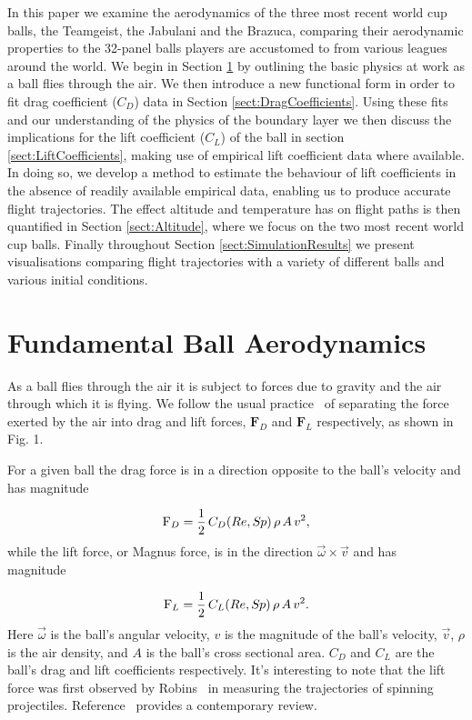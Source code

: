\documentclass[a4paper]{article}
\begin{document}
In this paper we examine the aerodynamics of the three most recent world cup balls, the Teamgeist, the Jabulani and the Brazuca, comparing their aerodynamic properties to the 32-panel balls players are accustomed to from various leagues around the world.  We begin in Section \ref{sect:FundamentalBallAerodynamics} by outlining the basic physics at work as a ball flies through the air.  We then introduce a new functional form in order to fit drag coefficient ($C_{D}$) data in Section \ref{sect:DragCoefficients}.  Using these fits and our understanding of the physics of the boundary layer we then discuss the implications for the lift coefficient ($C_{L}$) of the ball in section \ref{sect:LiftCoefficients}, making use of empirical lift coefficient data where available.  In doing so, we develop a method to estimate the behaviour of lift coefficients in the absence of readily available empirical data, enabling us to produce accurate flight trajectories.  The effect altitude and temperature has on flight paths is then quantified in Section \ref{sect:Altitude}, where we focus on the two most recent world cup balls.  Finally throughout Section \ref{sect:SimulationResults} we present visualisations comparing flight trajectories with a variety of different balls and various initial conditions.

\section{Fundamental Ball Aerodynamics}
\label{sect:FundamentalBallAerodynamics}
As a ball flies through the air it is subject to forces due to gravity and the air through which it is flying.  We follow the usual practice~\cite{CarreMJAsaiTAkatsukaTandHaakeSJ, JEGoff, Goffetal2017} of separating the force exerted by the air into drag and lift forces, $\textbf{F}_D$ and $\textbf{F}_L$ respectively, as shown in Fig. 1.

For a given ball the drag force is in a direction opposite to the ball's velocity and has magnitude~\cite{DeMestreN}

\begin{equation} \label{eq:Fd}
\textrm{F}_D = \frac{1}{2}\,C_D(Re, S\!{\kern 0.125em}p)\,{\rho}\,A\,v^{2},
\end{equation} 
%
while the lift force, or Magnus force, is in the direction $\vec{\omega} \times \vec{v}$ and has magnitude~\cite{DeMestreN} 

\begin{equation} \label{eq:FL}
\textrm{F}_L = \frac{1}{2}\,C_L(Re, S\!{\kern 0.125em}p)\,{\rho}\,A\,v^{2}.
\end{equation}
%
Here $\vec{\omega}$ is the ball's angular velocity, $v$ is the magnitude of the ball's velocity, $\vec{v}$, $\rho$ is the air density, and $A$ is the ball's cross sectional area.  $C_D$ and $C_L$ are the ball's drag and lift coefficients respectively. It's interesting to note that the lift force was first observed by Robins~\cite{Robins} in measuring the trajectories of spinning projectiles.  Reference~\cite{MagnusCylinder} provides a contemporary review.  
\end{document}

